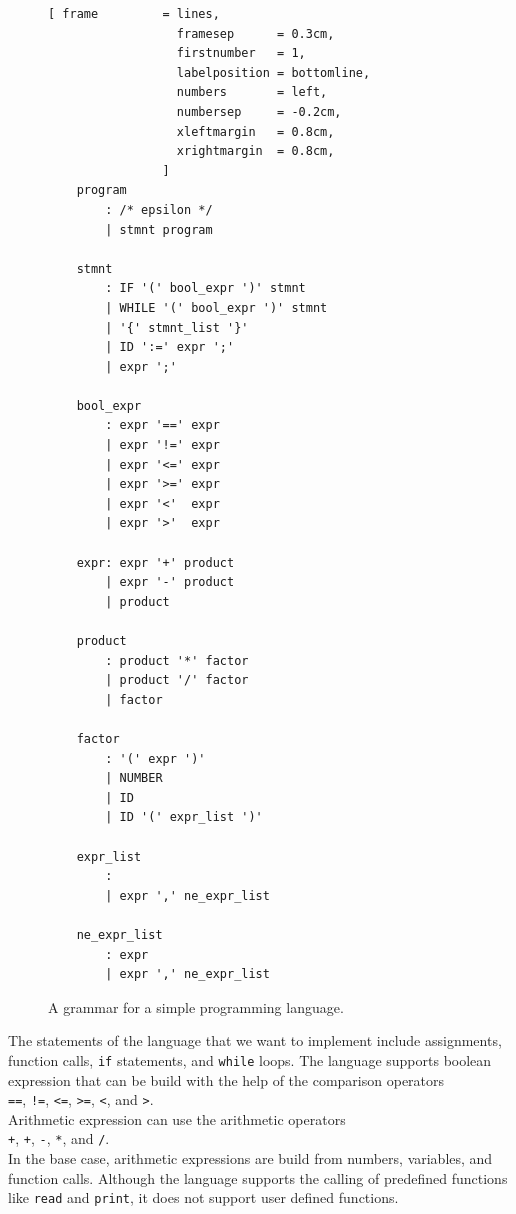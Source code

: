 \begin{figure}[!ht]
\centering
\begin{Verbatim}[ frame         = lines, 
                  framesep      = 0.3cm, 
                  firstnumber   = 1,
                  labelposition = bottomline,
                  numbers       = left,
                  numbersep     = -0.2cm,
                  xleftmargin   = 0.8cm,
                  xrightmargin  = 0.8cm,
                ]
    program
        : /* epsilon */
        | stmnt program
        
    stmnt 
        : IF '(' bool_expr ')' stmnt                 
        | WHILE '(' bool_expr ')' stmnt
        | '{' stmnt_list '}' 
        | ID ':=' expr ';'  
        | expr ';'       
    
    bool_expr 
        : expr '==' expr     
        | expr '!=' expr     
        | expr '<=' expr     
        | expr '>=' expr     
        | expr '<'  expr      
        | expr '>'  expr     
     
    expr: expr '+' product                 
        | expr '-' product
        | product
                  
    product
        : product '*' factor               
        | product '/' factor 
        | factor
    
    factor
        : '(' expr ')' 
        | NUMBER
        | ID
        | ID '(' expr_list ')'
    
    expr_list
        :
        | expr ',' ne_expr_list
    
    ne_expr_list
        : expr
        | expr ',' ne_expr_list
\end{Verbatim}
\vspace*{-0.3cm}
\caption{A grammar for a simple programming language.}
\label{fig:Pure.g}
\end{figure}

The statements of the language that we want to implement include assignments, function calls,
\texttt{if} statements, and \texttt{while} loops.  The language supports boolean expression that can be build
with the help of the comparison operators
\\[0.2cm]
\hspace*{1.3cm}
\texttt{==}, \texttt{!=}, \texttt{<=}, \texttt{>=}, \texttt{<}, and \texttt{>}.
\\[0.2cm]
Arithmetic expression can use the arithmetic operators 
\\[0.2cm]
\hspace*{1.3cm}
\texttt{+}, \texttt{+}, \texttt{-}, \texttt{*}, and \texttt{/}.
\\[0.2cm]
In the base case, arithmetic expressions are build from numbers, variables, and function calls.
Although the language supports the calling of predefined functions like \texttt{read} and \texttt{print},
it does not support user defined functions.

